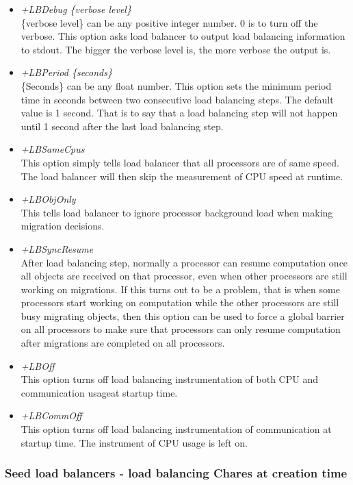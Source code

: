 \begin{enumerate}
\begin{itemize}
\item {\em +LBDebug \{verbose level\}} \\
     \{verbose level\} can be any positive integer number. 0 is to turn off the verbose. 
     This option asks load balancer to output load balancing information to stdout.
     The bigger the verbose level is, the more verbose the output is.
\item {\em +LBPeriod \{seconds\}} \\
     \{Seconds\} can be any float number. This option sets the minimum period time in 
seconds between two consecutive load balancing steps. The default value is 
1 second. That is to say that a load balancing step will not happen until
1 second after the last load balancing step.
\item {\em +LBSameCpus} \\
     This option simply tells load balancer that all processors are of same speed.
     The load balancer will then skip the measurement of CPU speed at runtime.
\item {\em +LBObjOnly} \\
     This tells load balancer to ignore processor background load when making migration decisions.
\item {\em +LBSyncResume} \\
     After load balancing step, normally a processor can resume computation 
once all objects are received on that processor, even when other processors
are still working on migrations.  If this turns out to be a problem, 
that is when some processors start working on computation while the other 
processors are still busy migrating objects, then this option can be used to force 
a global barrier on all processors to make sure that processors can only resume 
computation after migrations are completed on all processors.
\item {\em +LBOff} \\
     This option turns off load balancing instrumentation 
     of both CPU and communication usageat startup time. 
\item {\em +LBCommOff} \\
     This option turns off load balancing instrumentation of communication at startup time. 
     The instrument of CPU usage is left on.
\end{itemize}

\end{enumerate}

\subsubsection{Seed load balancers - load balancing Chares at creation time}

